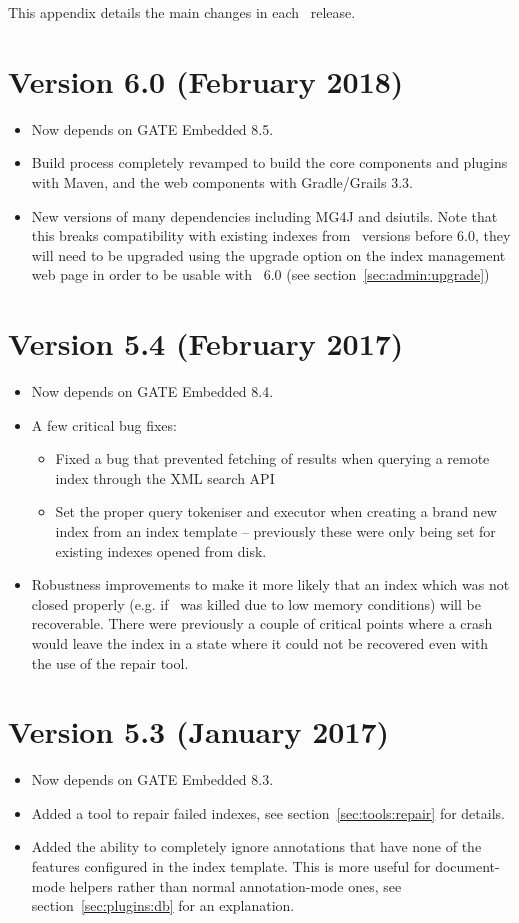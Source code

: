 This appendix details the main changes in each \Mimir\ release.

\section{Version 6.0 (February 2018)}
\begin{itemize}
\item Now depends on GATE Embedded 8.5.
\item Build process completely revamped to build the core components and plugins
  with Maven, and the web components with Gradle/Grails 3.3.
\item New versions of many dependencies including MG4J and dsiutils.  Note that
  this breaks compatibility with existing indexes from \Mimir\ versions before
  6.0, they will need to be upgraded using the upgrade option on the index
  management web page in order to be usable with \Mimir\ 6.0 (see
  section~\ref{sec:admin:upgrade})
\end{itemize}

\section{Version 5.4 (February 2017)}
\begin{itemize}
\item Now depends on GATE Embedded 8.4.
\item A few critical bug fixes:
  \begin{itemize}
  \item Fixed a bug that prevented fetching of results when querying a remote
    index through the XML search API
  \item Set the proper query tokeniser and executor when creating a brand new
    index from an index template -- previously these were only being set for
    existing indexes opened from disk.
  \end{itemize}
\item Robustness improvements to make it more likely that an index which was
  not closed properly (e.g. if \Mimir\ was killed due to low memory conditions)
  will be recoverable.  There were previously a couple of critical points where
  a crash would leave the index in a state where it could not be recovered even
  with the use of the repair tool.
\end{itemize}

\section{Version 5.3 (January 2017)}
\begin{itemize}
\item Now depends on GATE Embedded 8.3.
\item Added a tool to repair failed indexes, see section~\ref{sec:tools:repair}
  for details.
\item Added the ability to completely ignore annotations that have none of the
  features configured in the index template.  This is more useful for
  document-mode helpers rather than normal annotation-mode ones, see
  section~\ref{sec:plugins:db} for an explanation.
\end{itemize}

